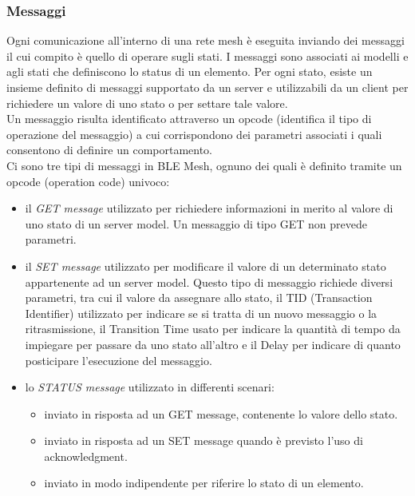 \subsubsection{Messaggi}
\label{subsub:messaggi}
Ogni comunicazione all'interno di una rete mesh è eseguita inviando dei messaggi il cui compito è quello di operare sugli stati. I messaggi sono associati ai modelli e agli stati che definiscono lo status di un elemento. Per ogni stato, esiste un insieme definito di messaggi supportato da un server e utilizzabili da un client per richiedere un valore di uno stato o per settare tale valore.\\
Un messaggio risulta identificato attraverso un opcode (identifica il tipo di operazione del messaggio) a cui corrispondono dei parametri associati i quali consentono di definire un comportamento.\\
Ci sono tre tipi di messaggi in BLE Mesh, ognuno dei quali è definito tramite un opcode (operation code) univoco:
\begin{itemize}
    \item il \textit{GET message} utilizzato per richiedere informazioni in merito al valore di uno stato di un server model. Un messaggio di tipo GET non prevede parametri.
    
    \item il \textit{SET message} utilizzato per modificare il valore di un determinato stato appartenente ad un server model. Questo tipo di messaggio richiede diversi parametri, tra cui il valore da assegnare allo stato, il TID (Transaction Identifier) utilizzato per indicare se si tratta di un nuovo messaggio o la ritrasmissione, il Transition Time usato per indicare la quantità di tempo da impiegare per passare da uno stato all'altro e il Delay per indicare di quanto posticipare l'esecuzione del messaggio.
    
    \item lo \textit{STATUS message} utilizzato in differenti scenari:
    \begin{itemize}
        \item inviato in risposta ad un GET message, contenente lo valore dello stato.
        \item inviato in risposta ad un SET message quando è previsto l'uso di acknowledgment.
        \item inviato in modo indipendente per riferire lo stato di un elemento.
    \end{itemize}
\end{itemize}

